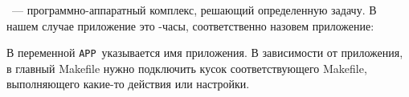 
\ --- программно-аппаратный комплекс, решающий определенную
задачу. В нашем случае приложение это \linux-часы, соответственно назовем
приложение:



В переменной \verb|APP|\ указывается имя приложения. 
В зависимости от приложения, в главный Makefile нужно подключить кусок
соответствующего Makefile, выполняющего какие-то действия или настройки.



